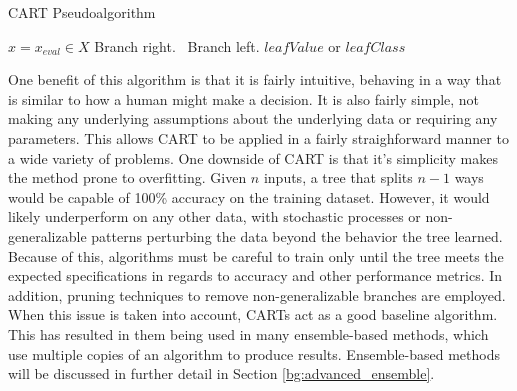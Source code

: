 	\begin{algorithm}[ht]
		\caption{CART Pseudoalgorithm}
		\label{code:bg_cart}
		\begin{algorithmic}[1]
			\State $x = x_{eval} \in X$
			 Branch right.
			\Else \ Branch left.
			\EndIf
			\EndWhile
			\State \Return $leafValue$ or $leafClass$
			\EndProcedure
		\end{algorithmic}
	\end{algorithm}
	\par One benefit of this algorithm is that it is fairly intuitive, behaving in a way that is similar to how a human might make a decision. It is also fairly simple, not making any underlying assumptions about the underlying data or requiring any parameters. This allows CART to be applied in a fairly straighforward manner to a wide variety of problems. One downside of CART is that it's simplicity makes the method prone to overfitting. Given $n$ inputs, a tree that splits $n-1$ ways would be capable of 100\% accuracy on the training dataset. However, it would likely underperform on any other data, with stochastic processes or non-generalizable patterns perturbing the data beyond the behavior the tree learned. Because of this, algorithms must be careful to train only until the tree meets the expected specifications in regards to accuracy and other performance metrics. In addition, pruning techniques to remove non-generalizable branches are employed. When this issue is taken into account, CARTs act as a good baseline algorithm. This has resulted in them being used in many ensemble-based methods, which use multiple copies of an algorithm to produce results. Ensemble-based methods will be discussed in further detail in Section \ref{bg:advanced_ensemble}.
	
